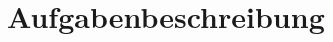 \section{Aufgabenbeschreibung}
\label{sec:appendix_a}
\begin{comment}
\begin{enumerate}
	\item[\bold (a)] \boldtext{Realization of an own setup of demonstrators}\\
	The task is to implement a keystroke dynamics (KD) acquisition and matching prototype from scratch (in JAVA).\\
	The tasks of the group are to implement an own demonstrator for this simple to acquire and process modality,
	using di-graph [Sim2007] and tri-graph representations of fixed-length input as feature space and use this
	prototype to perform user authentication.
	\item[\bold (b)] \boldtext{Data to be used}\\
	This group has to collect with their own tool KD data of the course participants. The set of samples must
	contain the following semantics:
	\begin{itemize}[noitemsep]
		\item[-] A pseudonym
		\item[-] A given pin ("77993")
		\item[-] A pin chosen by the donor of the samples
		\item[-] A sketch of a symbol chosen by the donor of the samples
		\item[-] The answer to the question "Where are you from?"
	\end{itemize}
	Furthermore, the participants in this group are asked to contribute to the data collections of the handwriting (HW)
	and (other) keystroke dynamic (KD) groups!
	\item[\bold (c)] \boldtext{Evaluation}\\
	Run your prototype (see subtask (a) above) on the collected data (see subtask (b) above) and perform a performance

\end{comment}
